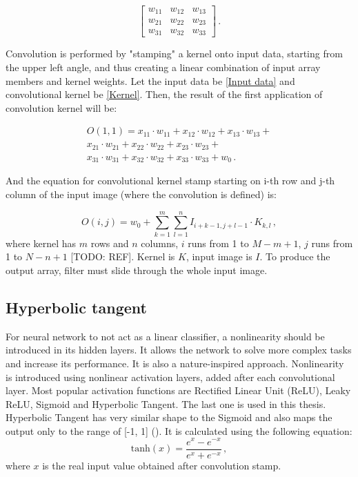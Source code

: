 \begin{equation}
	\begin{bmatrix}
    w_{11}       & w_{12} & w_{13} \\
    w_{21}       & w_{22} & w_{23} \\
    w_{31}       & w_{32} & w_{33} 
	\end{bmatrix}\,.
\label{Kernel}
\end{equation}

Convolution is performed by "stamping" a kernel onto input data, starting from the upper left angle, and thus creating a linear combination of input array members and kernel weights. Let the input data be \eqref{Input data} and convolutional kernel be \eqref{Kernel}. Then, the result of the first application of convolution kernel will be:

\begin{equation}
\begin{aligned}
	O(1, 1) = x_{11}\cdot w_{11} + x_{12}\cdot w_{12} + x_{13}\cdot w_{13} +\\
	x_{21}\cdot w_{21} + x_{22}\cdot w_{22} + x_{23}\cdot w_{23} + \\
	x_{31}\cdot w_{31} + x_{32}\cdot w_{32} + x_{33}\cdot w_{33} + w_0\,.
\end{aligned}
\end{equation}

And the equation for convolutional kernel stamp starting on i-th row and j-th column of the input image (where the convolution is defined) is:

\begin{equation}
	O(i, j) = w_0 + \sum\limits_{k=1}^m \sum\limits_{l=1}^n I_{i+k-1, j+l-1}\cdot K_{k, l} \,,
\end{equation}
where kernel has $m$ rows and $n$ columns, $i$ runs from 1 to $M-m+1$, $j$ runs from 1 to $N-n+1$ [TODO: REF]. Kernel is $K$, input image is $I$. To produce the output array, filter must slide through the whole input image.


\subsection{Hyperbolic tangent}

For neural network to not act as a linear classifier, a nonlinearity should be introduced in its hidden layers. It allows the network to solve more complex tasks and increase its performance. It is also a nature-inspired approach. Nonlinearity is introduced using nonlinear activation layers, added after each convolutional layer. Most popular activation functions are Rectified Linear Unit (ReLU), Leaky ReLU, Sigmoid and Hyperbolic Tangent. The last one is used in this thesis. Hyperbolic Tangent has very similar shape to the Sigmoid and also maps the output only to the range of [-1, 1] (). It is calculated using the following equation:
\begin{equation}
	\textrm{tanh}(x) = \frac{e^x-e^{-x}}{e^x+e^{-x}}\,,
\end{equation}
where $x$ is the real input value obtained after convolution stamp.

